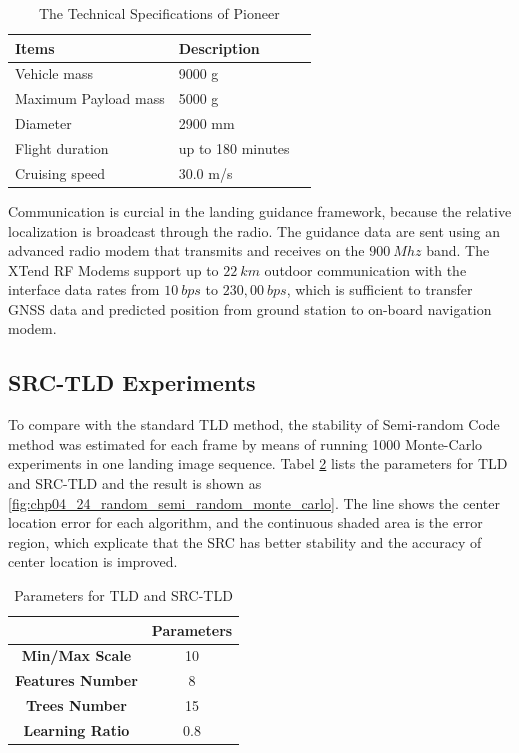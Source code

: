 \begin{table}
	\caption{The Technical Specifications of Pioneer}
	\label{tab:platform_specifications}
	\begin{center}
		\renewcommand{\arraystretch}{1.1}
		\begin{tabular}{lll}
			\hline
			\textbf {Items}  & \textbf{Description} \\
			\hline
			Vehicle mass & 9000 g \\
			Maximum Payload mass & 5000 g \\
			Diameter & 2900 mm \\
			Flight duration & up to 180 minutes \\
			Cruising speed & 30.0 m/s \\
			\hline
		\end{tabular}
	\end{center}
\end{table}

Communication is curcial in the landing guidance framework, because the relative localization is broadcast through the radio. The guidance data are sent using an advanced radio modem that transmits and receives on the $900\ Mhz$ band. The XTend RF Modems support up to $22\ km$ outdoor communication with the interface data rates from $10\ bps$ to $230,00\ bps$, which is sufficient to transfer GNSS data and predicted position from ground station to on-board navigation modem.

\subsection{SRC-TLD Experiments}
To compare with the standard TLD method, the stability of Semi-random Code method was estimated for each frame by means of running 1000 Monte-Carlo experiments in one landing image sequence. Tabel \ref{lab:TLD_params} lists the parameters for TLD and SRC-TLD and the result is shown as \ref{fig:chp04_24_random_semi_random_monte_carlo}. The line shows the center location error for each algorithm, and the continuous shaded area is the error region, which explicate that the SRC has better stability and the accuracy of center location is improved. 

\begin{table}[!ht]
	\centering
	\caption{Parameters for TLD and SRC-TLD}
	\label{lab:TLD_params}
	\begin{tabular}{cc}
		\hline
		& \textbf{Parameters} \\ \hline
		 \textbf{Min/Max Scale} & 10 \\
		 \textbf{Features Number} & 8 \\
		 \textbf{Trees Number} & 15 \\
		 \textbf{Learning Ratio} & 0.8 \\ \hline
	\end{tabular}
\end{table}

